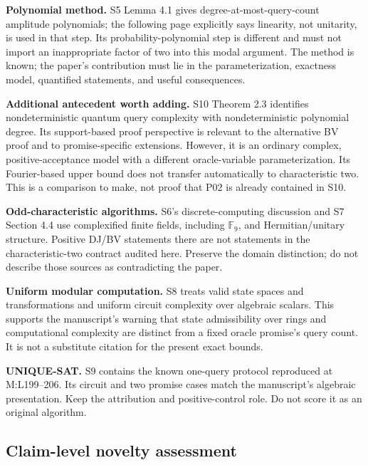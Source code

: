 \documentclass[
  11pt,
]{article}
\begin{document}
\textbf{Polynomial method.} S5 Lemma 4.1 gives
degree-at-most-query-count amplitude polynomials; the following page
explicitly says linearity, not unitarity, is used in that step. Its
probability-polynomial step is different and must not import an
inappropriate factor of two into this modal argument. The method is
known; the paper's contribution must lie in the parameterization,
exactness model, quantified statements, and useful consequences.

\textbf{Additional antecedent worth adding.} S10 Theorem 2.3 identifies
nondeterministic quantum query complexity with nondeterministic
polynomial degree. Its support-based proof perspective is relevant to
the alternative BV proof and to promise-specific extensions. However, it
is an ordinary complex, positive-acceptance model with a different
oracle-variable parameterization. Its Fourier-based upper bound does not
transfer automatically to characteristic two. This is a comparison to
make, not proof that P02 is already contained in S10.

\textbf{Odd-characteristic algorithms.} S6's discrete-computing
discussion and S7 Section 4.4 use complexified finite fields, including
\(\mathbb F_9\), and Hermitian/unitary structure. Positive DJ/BV
statements there are not statements in the characteristic-two contract
audited here. Preserve the domain distinction; do not describe those
sources as contradicting the paper.

\textbf{Uniform modular computation.} S8 treats valid state spaces and
transformations and uniform circuit complexity over algebraic scalars.
This supports the manuscript's warning that state admissibility over
rings and computational complexity are distinct from a fixed oracle
promise's query count. It is not a substitute citation for the present
exact bounds.

\textbf{UNIQUE-SAT.} S9 contains the known one-query protocol reproduced
at M:L199--206. Its circuit and two promise cases match the manuscript's
algebraic presentation. Keep the attribution and positive-control role.
Do not score it as an original algorithm.

\subsection{Claim-level novelty
assessment}\label{claim-level-novelty-assessment}
\end{document}

